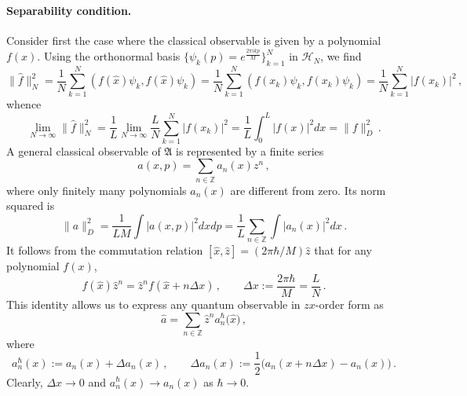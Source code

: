 \documentclass[12pt,a4paper]{article}
\numberwithin{equation}{section}
\theoremstyle{theorem}
\theoremstyle{remark}
\newcommand{\hn}{\mathcal{H}_N}
\newcommand{\fa}{\mathfrak{A}}
\begin{document}
\paragraph{Separability condition.} Consider first the case where the classical observable is given by a polynomial $f(x)$. Using the orthonormal basis $\big\{\psi_k(p)=e^{\frac{2\pi i k p}{M}}\big\}_{k=1}^N$ in $\hn$, we find
\begin{equation}
    \|\hat f\|^2_N=\frac{1}{N}\sum_{k=1}^N(f(\hat x)\psi_k,f(\hat x)\psi_k) =\frac{1}{N}\sum_{k=1}^N(f(x_k)\psi_k,f(x_k)\psi_k)  =\frac{1}{N}\sum_{k=1}^N |f(x_k)|^2\,,
\end{equation}
whence 
\begin{equation}\label{fN}
\displaystyle    \lim_{N\rightarrow \infty}  \|\hat f\|^2_N=\frac1L\lim_{N\to\infty} \frac{L}{N}\sum_{k=1}^N |f(x_k)|^2 =\frac1L\int_0^L|f(x)|^2dx=\|f\|^2_D\,.
\end{equation}
A general classical observable of $\fa$ is represented by a finite series 
             \begin{equation}
             a(x,p)=\sum_{n\in\mathbb{Z}} a_n (x) z^n\,,
             \end{equation}
where only finitely many polynomials $a_n(x)$ are different from zero. Its norm squared is
             \begin{equation}
                 \|a\|^2_D=\frac1{LM}\int |a(x,p)|^2dxdp=\frac1{L}\sum_{n\in \mathbb{Z}}\int |{a}_n(x)|^2dx\,.
             \end{equation}
             It follows from the commutation relation $[\hat x,\hat z ]=(2\pi\hbar/M)\hat{z}$ that for any polynomial $f(x)$,
             \begin{equation}\label{fz}
                 f(\hat x)\hat{z}^n= \hat{z}^nf(\hat x+n\Delta x)\,,  \qquad \Delta x:=\frac{2\pi\hbar}{M}=\frac LN\,.  
             \end{equation}
    This identity allows us to express any quantum observable in $zx$-order form as 
        \begin{equation}\label{zx}
                \hat{a}=\sum_{n\in \mathbb{Z}}\hat{z}^n a^\hbar_n(\hat{x}\big)\,, 
                \end{equation}
                where  
                \begin{equation}\label{ah}
                    {a}^\hbar_n(x):=a_n(x)+\Delta a_n(x)\,,\qquad \Delta a_n(x):=\frac12\big(a_n(x+n\Delta x)-a_n(x)\big)\,.
                \end{equation}
Clearly,  $\Delta x\rightarrow 0$ and $a^\hbar_n(x)\rightarrow a_n(x)$ as $\hbar\rightarrow 0$. 
                
\end{document}
